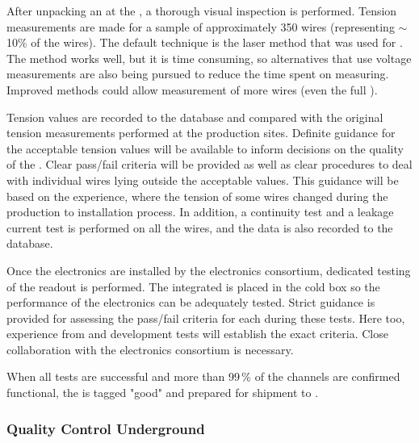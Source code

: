 After unpacking an  at the , a thorough visual inspection is performed. Tension measurements are made for a sample of approximately \num{350} wires (representing $\sim$10\% of the wires). The default technique is the laser method that was used for .  The method works well, but it is time consuming, so alternatives that use voltage measurements are also being pursued to reduce the time spent on measuring. Improved methods could allow measurement of more wires (even the full ). 

Tension values are recorded to the database and compared with the original tension measurements performed at the production sites. Definite guidance for the acceptable tension values will be available to inform decisions on the quality of the . Clear pass/fail criteria %
will be provided as well as clear procedures to deal with individual wires lying outside the acceptable values. %
This guidance will be based on the  experience, where the tension of some wires changed during the production to installation process. In addition, a continuity test and a leakage current test is performed on all the wires, and the data is also recorded to the database. 

Once the electronics are installed by the electronics consortium, dedicated testing of the  readout is performed. The integrated  is placed in the cold box so the performance of the electronics can be adequately tested. Strict guidance is provided %
for assessing the pass/fail criteria for each  during these tests.  Here too, experience from  and development tests will establish the exact criteria. Close collaboration with the electronics consortium is necessary.

When all tests are successful and more than \num{99}\,\% of the channels are confirmed functional, the  is  tagged "good" and prepared for shipment to \surf{}.

\subsubsection{Quality Control Underground}
\label{sec:fdsp-apa-install-qc_underground}

